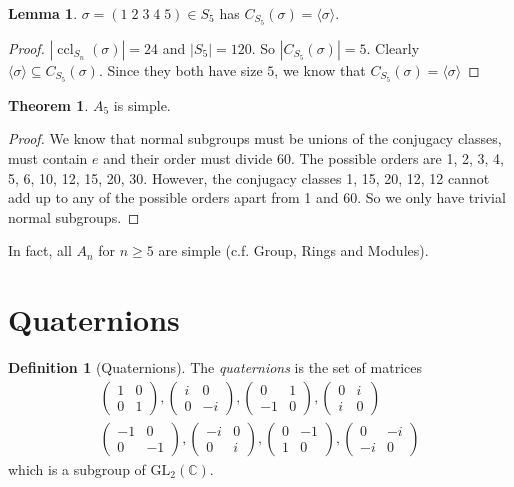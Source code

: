 \documentclass[a4paper]{article}
\theoremstyle{definition}
\newtheorem*{thm}{Theorem}
\newtheorem*{defi}{Definition}
\newtheorem*{lemma}{Lemma}
\newcommand{\C}{\mathbb{C}}
\newcommand{\bra}{\langle}
\newcommand{\ket}{\rangle}
\newcommand{\GL}{\mathrm{GL}}
\let\stdsection\section
\renewcommand\section{\newpage\stdsection}
\DeclareMathOperator\ccl{ccl}
\begin{document}
\begin{lemma}
  $\sigma = (1\; 2\; 3\; 4\; 5)\in S_5$ has $C_{S_5}(\sigma) = \bra \sigma \ket$. \end{lemma}

\begin{proof}
  $|\ccl_{S_n}(\sigma)| = 24$ and $|S_5| = 120$. So $|C_{S_5}(\sigma)| = 5$. Clearly $\bra \sigma \ket \subseteq C_{S_5}(\sigma)$. Since they both have size $5$, we know that $C_{S_5}(\sigma) = \bra \sigma\ket$
\end{proof}

\begin{thm}
  $A_5$ is simple.
\end{thm}

\begin{proof}
  We know that normal subgroups must be unions of the conjugacy classes, must contain $e$ and their order must divide 60. The possible orders are 1, 2, 3, 4, 5, 6, 10, 12, 15, 20, 30. However, the conjugacy classes 1, 15, 20, 12, 12 cannot add up to any of the possible orders apart from 1 and 60. So we only have trivial normal subgroups.
\end{proof}
In fact, all $A_n$ for $n\geq 5$ are simple (c.f. Group, Rings and Modules).

\section{Quaternions}
\begin{defi}[Quaternions]
  The \emph{quaternions} is the set of matrices
  \begin{gather*}
  \begin{pmatrix}
    1&0\\0&1
  \end{pmatrix}, 
  \begin{pmatrix}
    i & 0\\0&-i
  \end{pmatrix},
  \begin{pmatrix}
    0&1\\-1&0
  \end{pmatrix},
  \begin{pmatrix}
    0&i\\i&0
  \end{pmatrix}
  \\
  \begin{pmatrix}
      -1&0\\0&-1
    \end{pmatrix}, 
    \begin{pmatrix}
      -i & 0\\0&i
    \end{pmatrix},
    \begin{pmatrix}
      0&-1\\1&0
    \end{pmatrix},
    \begin{pmatrix}
      0&-i\\-i&0
    \end{pmatrix}
  \end{gather*}
    which is a subgroup of $\GL_2(\C)$.
\end{defi}
\end{document}
